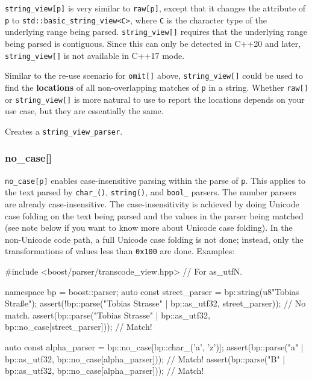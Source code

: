 \texttt{string\_view{[}p{]}} is very similar to \texttt{raw{[}p{]}}, except that it changes the attribute of \texttt{p} to \texttt{std::basic\_string\_view<C>}, where \texttt{C} is the character type of the underlying range being parsed. \texttt{string\_view{[}{]}} requires that the underlying range being parsed is contiguous. Since this can only be detected in C++20 and later, \texttt{string\_view{[}{]}} is not available in C++17 mode.

Similar to the re-use scenario for \texttt{omit{[}{]}} above, \texttt{string\_view{[}{]}} could be used to find the \textbf{locations} of all non-overlapping matches of \texttt{p} in a string. Whether \texttt{raw{[}{]}} or \texttt{string\_view{[}{]}} is more natural to use to report the locations depends on your use case, but they are essentially the same.

Creates a \texttt{string\_view\_parser}.

\subsubsection{no\_case{[}{]}}

\texttt{no\_case{[}p{]}} enables case-insensitive parsing within the parse of \texttt{p}. This applies to the text parsed by \texttt{char\_()}, \texttt{string()}, and \texttt{bool\_} parsers. The number parsers are already case-insensitive. The case-insensitivity is achieved by doing Unicode case folding on the text being parsed and the values in the parser being matched (see note below if you want to know more about Unicode case folding). In the non-Unicode code path, a full Unicode case folding is not done; instead, only the transformations of values less than \texttt{0x100} are done. Examples:

\begin{code}
#include <boost/parser/transcode_view.hpp> // For as_utfN.

namespace bp = boost::parser;
auto const street_parser = bp::string(u8"Tobias Straße");
assert(!bp::parse("Tobias Strasse" | bp::as_utf32, street_parser));             // No match.
assert(bp::parse("Tobias Strasse" | bp::as_utf32, bp::no_case[street_parser])); // Match!

auto const alpha_parser = bp::no_case[bp::char_('a', 'z')];
assert(bp::parse("a" | bp::as_utf32, bp::no_case[alpha_parser])); // Match!
assert(bp::parse("B" | bp::as_utf32, bp::no_case[alpha_parser])); // Match!
\end{code}

